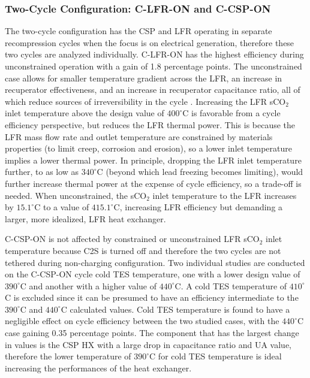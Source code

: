 \begin{paracol}{2}
\linenumbers
\switchcolumn


\subsubsection{Two-Cycle Configuration: C-LFR-ON and C-CSP-ON}

The two-cycle configuration has the CSP and LFR operating in separate recompression cycles when the focus is on electrical generation, therefore these two cycles are analyzed individually. C-LFR-ON has the highest efficiency during unconstrained operation with a gain of 1.8 percentage points. The unconstrained case allows for smaller temperature gradient across the LFR, an increase in recuperator effectiveness, and an increase in recuperator capacitance ratio, all of which reduce sources of irreversibility in the cycle \cite{klein_nellis_2011}. Increasing the LFR sCO$_2$ inlet temperature above the design value of $400^{\circ}$C is favorable from a cycle efficiency perspective, but reduces the LFR thermal power. This is because the LFR mass flow rate and outlet temperature are constrained by materials properties (to limit creep, corrosion and erosion), so a lower inlet temperature implies a lower thermal power. In principle, dropping the LFR inlet temperature further, to as low as $340^{\circ}$C (beyond which lead freezing becomes limiting), would further increase thermal power at the expense of cycle efficiency, so a trade-off is needed. When unconstrained, the sCO$_2$ inlet temperature to the LFR increases by $15.1^{\circ}$C to a value of $415.1^{\circ}$C, increasing LFR efficiency but demanding a larger, more idealized, LFR heat exchanger.

C-CSP-ON is not affected by constrained or unconstrained LFR sCO$_2$ inlet temperature because C2S is turned off and therefore the two cycles are not tethered during non-charging configuration. Two individual studies are conducted on the C-CSP-ON cycle cold TES temperature, one with a lower design value of $390^{\circ}$C and another with a higher value of $440^{\circ}$C. A cold TES temperature of $410^{\circ}$C is excluded since it can be presumed to have an efficiency intermediate to the $390^{\circ}$C and $440^{\circ}$C calculated values. Cold TES temperature is found to have a negligible effect on cycle efficiency between the two studied cases, with the $440^{\circ}$C case gaining 0.35 percentage points. The component that has the largest change in values is the CSP HX with a large drop in capacitance ratio and UA value, therefore the lower temperature of $390^{\circ}$C for cold TES temperature is ideal increasing the performances of the heat exchanger. 


\end{paracol}
